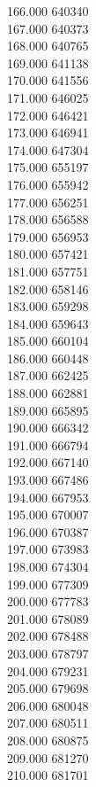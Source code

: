 { 166.000	640340 \\
 167.000	640373 \\
 168.000	640765 \\
 169.000	641138 \\
 170.000	641556 \\
 171.000	646025 \\
 172.000	646421 \\
 173.000	646941 \\
 174.000	647304 \\
 175.000	655197 \\
 176.000	655942 \\
 177.000	656251 \\
 178.000	656588 \\
 179.000	656953 \\
 180.000	657421 \\
 181.000	657751 \\
 182.000	658146 \\
 183.000	659298 \\
 184.000	659643 \\
 185.000	660104 \\
 186.000	660448 \\
 187.000	662425 \\
 188.000	662881 \\
 189.000	665895 \\
 190.000	666342 \\
 191.000	666794 \\
 192.000	667140 \\
 193.000	667486 \\
 194.000	667953 \\
 195.000	670007 \\
 196.000	670387 \\
 197.000	673983 \\
 198.000	674304 \\
 199.000	677309 \\
 200.000	677783 \\
 201.000	678089 \\
 202.000	678488 \\
 203.000	678797 \\
 204.000	679231 \\
 205.000	679698 \\
 206.000	680048 \\
 207.000	680511 \\
 208.000	680875 \\
 209.000	681270 \\
 210.000	681701 \\
}
